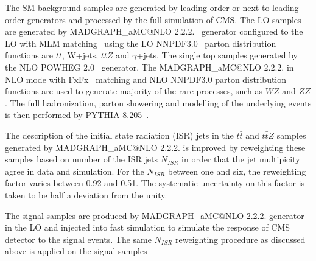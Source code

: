 The SM background samples are generated by leading-order or next-to-leading-order generators and processed by the full simulation of CMS. The LO samples are generated by MADGRAPH\_aMC@NLO 2.2.2.~\cite{Alwall:2014hca} generator configured to the LO with MLM matching~\cite{Alwall:2007fs} using the LO NNPDF3.0~\cite{Ball:2014uwa} parton distribution functions are  $t\bar{t}$, W+jets, $t\bar{t}Z$ and $\gamma$+jets. The single top samples generated by the NLO POWHEG 2.0~\cite{Alioli:2010xd} generator. The MADGRAPH\_aMC@NLO 2.2.2. in NLO mode with FxFx~\cite{Frederix:2012ps} matching and NLO NNPDF3.0 parton distribution functions are used to generate majority of the rare processes, such as $WZ$ and $ZZ$. The full hadronization, parton showering and modelling of the underlying events is then performed by PYTHIA 8.205~\cite{Sjostrand:2014zea}.

The description of the initial state radiation (ISR) jets in the $t\bar{t}$ and $t\bar{t}Z$ samples generated by MADGRAPH\_aMC@NLO 2.2.2. is improved by reweighting these samples based on number of the ISR jets $N_{ISR}$ in order that the jet multipicity agree in data and simulation. For the $N_{ISR}$ between one and six, the reweighting factor varies between 0.92 and 0.51. The systematic uncertainty on this factor is taken to be half a deviation from the unity.

The signal samples are produced by MADGRAPH\_aMC@NLO 2.2.2. generator in the LO and injected into fast simulation to simulate the response of CMS detector to the signal events.  The same $N_{ISR}$ reweighting procedure as discussed above is applied on the signal samples 

